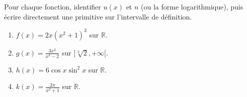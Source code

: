 \documentclass[11pt]{article}
\begin{document}
\begin{exercice}
Pour chaque fonction, identifier $u(x)$ et $n$ (ou la forme logarithmique), puis écrire directement une primitive sur l'intervalle de définition.
\begin{enumerate}
    \item $f(x) = 2x(x^2+1)^3$ sur $\mathbb{R}$.
    \item $g(x) = \frac{3x^2}{x^3-2}$ sur $]\sqrt[3]{2}, +\infty[$.
    \item $h(x) = 6\cos x \sin^2 x$ sur $\mathbb{R}$.
    \item $k(x) = \frac{2x}{x^2+1}$ sur $\mathbb{R}$.
\end{enumerate}
\end{exercice}
\end{document}
